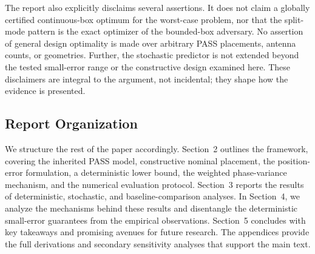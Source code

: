 The report also explicitly disclaims several assertions. It does not claim a globally certified continuous-box optimum for the worst-case problem, nor that the split-mode pattern is the exact optimizer of the bounded-box adversary. No assertion of general design optimality is made over arbitrary PASS placements, antenna counts, or geometries. Further, the stochastic predictor is not extended beyond the tested small-error range or the constructive design examined here. These disclaimers are integral to the argument, not incidental; they shape how the evidence is presented.

\subsection{Report Organization}

We structure the rest of the paper accordingly. Section~2 outlines the framework, covering the inherited PASS model, constructive nominal placement, the position-error formulation, a deterministic lower bound, the weighted phase-variance mechanism, and the numerical evaluation protocol. Section~3 reports the results of deterministic, stochastic, and baseline-comparison analyses. In Section~4, we analyze the mechanisms behind these results and disentangle the deterministic small-error guarantees from the empirical observations. Section~5 concludes with key takeaways and promising avenues for future research. The appendices provide the full derivations and secondary sensitivity analyses that support the main text.
